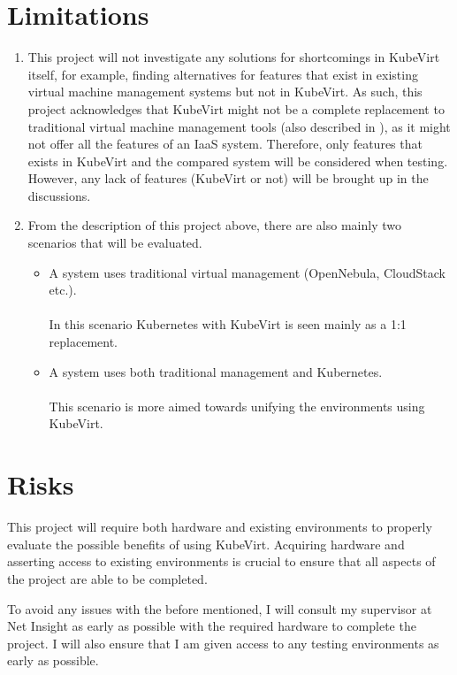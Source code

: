 \documentclass{article}
\begin{document}
\section{Limitations}
\begin{enumerate}
    \item This project will not investigate any solutions for shortcomings in KubeVirt itself, for example, finding alternatives for features that exist in existing virtual machine management systems but not in KubeVirt. As such, this project acknowledges that KubeVirt might not be a complete replacement to traditional virtual machine management tools (also described in \cite{kupenstack}), as it might not offer all the features of an IaaS system. Therefore, only features that exists in KubeVirt and the compared system will be considered when testing. However, any lack of features (KubeVirt or not) will be brought up in the discussions.  
    \item From the description of this project above, there are also mainly two scenarios that will be evaluated. 
    \begin{itemize}
        \item A system uses traditional virtual management (OpenNebula, CloudStack etc.). \\
        \\
        In this scenario Kubernetes with KubeVirt is seen mainly as a 1:1 replacement.\\ 
        \item A system uses both traditional management and Kubernetes. \\
        \\
        This scenario is more aimed towards unifying the environments using KubeVirt. \\
    \end{itemize}
\end{enumerate}

\section{Risks}
This project will require both hardware and existing environments to properly evaluate the possible benefits of using KubeVirt. Acquiring hardware and asserting access to existing environments is crucial to ensure that all aspects of the project are able to be completed. 

To avoid any issues with the before mentioned, I will consult my supervisor at Net Insight as early as possible with the required hardware to complete the project. I will also ensure that I am given access to any testing environments as early as possible.
\end{document}
